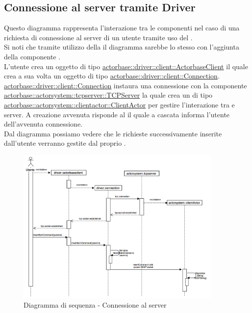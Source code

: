 \documentclass{scalatekids-article}
\begin{document}
\subsection{Connessione al server tramite Driver}

Questo diagramma rappresenta l'interazione tra le componenti nel caso di una richiesta di connessione al server di un utente tramite uso del .\\Si noti che tramite utilizzo della  il diagramma sarebbe lo stesso con l'aggiunta della componente .\\
L'utente crea un oggetto di tipo \hyperref[sec:actorbase::driver::client::ActorbaseClient]{actorbase::driver::client::ActorbaseClient}
il quale crea a sua volta un oggetto di tipo \hyperref[sec:actorbase::driver::client::Connection]{actorbase::driver::client::Connection}.
\hyperref[sec:actorbase::driver::client::Connection]{actorbase::driver::client::Connection}
instaura una connessione  con la componente
\hyperref[sec:actorbase::actorsystem::tcpserver::TCPServer]{actorbase::actorsystem::tcpserver::TCPServer} la quale crea un  di tipo
\hyperref[sec:actorbase::actorsystem::clientactor::ClientActor]{actorbase::actorsystem::clientactor::ClientActor}
per gestire l'interazione tra  e server. A creazione avvenuta risponde al  il quale a cascata informa l'utente dell'avvenuta
connessione.\\
Dal diagramma possiamo vedere che le richieste successivamente inserite
dall'utente verranno gestite dal proprio .\\

\begin{figure}[H]
  \begin{center}
    \includegraphics[width=0.9\textwidth, keepaspectratio]{img/diagrammiSequenza/esempioConnessione.png}
    \caption{Diagramma di sequenza - Connessione al server}
  \end{center}
\end{figure}
\end{document}
